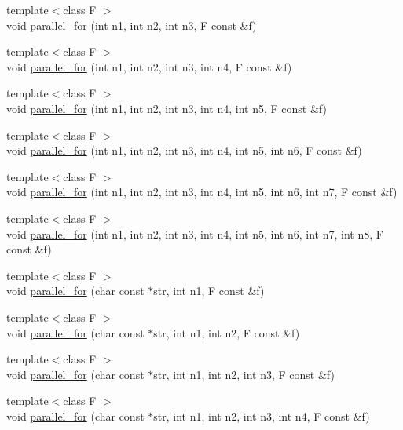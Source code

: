 \begin{DoxyCompactItemize}
\item 
{\footnotesize template$<$class F $>$ }\\void \hyperlink{namespaceyakl_ac86865a80e72eeb5bd8491d73e6e3bd6}{parallel\+\_\+for} (int n1, int n2, int n3, F const \&f)
\item 
{\footnotesize template$<$class F $>$ }\\void \hyperlink{namespaceyakl_a17a0fe52b5f35cc9d16a7d057b304b81}{parallel\+\_\+for} (int n1, int n2, int n3, int n4, F const \&f)
\item 
{\footnotesize template$<$class F $>$ }\\void \hyperlink{namespaceyakl_a96e9f12fb9431492fd92e518c540fe81}{parallel\+\_\+for} (int n1, int n2, int n3, int n4, int n5, F const \&f)
\item 
{\footnotesize template$<$class F $>$ }\\void \hyperlink{namespaceyakl_a9475cbfb86a88937c4b6a4cf253467f4}{parallel\+\_\+for} (int n1, int n2, int n3, int n4, int n5, int n6, F const \&f)
\item 
{\footnotesize template$<$class F $>$ }\\void \hyperlink{namespaceyakl_a02a1ee8a10a92728d6d9a39a1aa5e2ff}{parallel\+\_\+for} (int n1, int n2, int n3, int n4, int n5, int n6, int n7, F const \&f)
\item 
{\footnotesize template$<$class F $>$ }\\void \hyperlink{namespaceyakl_a8fb891e89ae5a57cc11fb82a7b327025}{parallel\+\_\+for} (int n1, int n2, int n3, int n4, int n5, int n6, int n7, int n8, F const \&f)
\item 
{\footnotesize template$<$class F $>$ }\\void \hyperlink{namespaceyakl_ad29eaf71e4867503e62bd44e3ed0d10a}{parallel\+\_\+for} (char const $\ast$str, int n1, F const \&f)
\item 
{\footnotesize template$<$class F $>$ }\\void \hyperlink{namespaceyakl_a33ca6c48b3eabba7ae05942764b29d89}{parallel\+\_\+for} (char const $\ast$str, int n1, int n2, F const \&f)
\item 
{\footnotesize template$<$class F $>$ }\\void \hyperlink{namespaceyakl_a5070d09cae3de942302799314b43dbc4}{parallel\+\_\+for} (char const $\ast$str, int n1, int n2, int n3, F const \&f)
\item 
{\footnotesize template$<$class F $>$ }\\void \hyperlink{namespaceyakl_a88376089821b56aa4d7ddabf6dfcbe51}{parallel\+\_\+for} (char const $\ast$str, int n1, int n2, int n3, int n4, F const \&f)

\end{DoxyCompactItemize}
